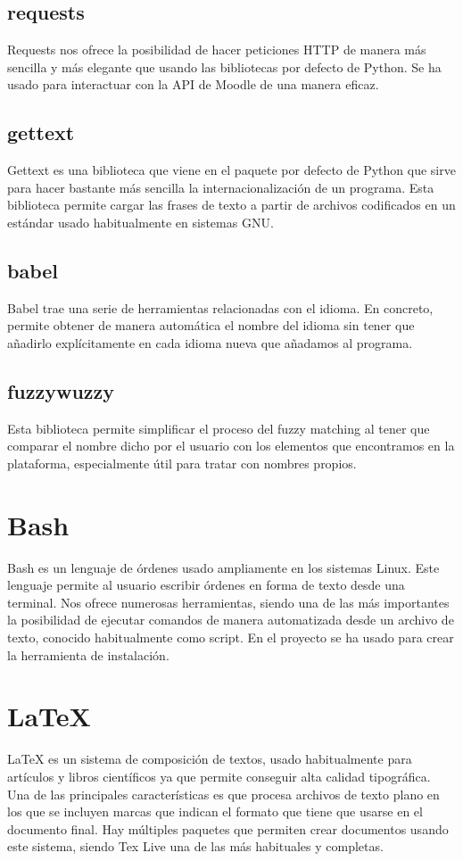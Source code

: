 \subsection{requests}
Requests nos ofrece la posibilidad de hacer peticiones HTTP de manera más sencilla y más elegante que usando las bibliotecas por defecto de Python. Se ha usado para interactuar con la API de Moodle de una manera eficaz.
\subsection{gettext}
Gettext es una biblioteca que viene en el paquete por defecto de Python que sirve para hacer bastante más sencilla la internacionalización de un programa. Esta biblioteca permite cargar las frases de texto a partir de archivos codificados en un estándar usado habitualmente en sistemas GNU.
\subsection{babel}
Babel trae una serie de herramientas relacionadas con el idioma. En concreto, permite obtener de manera automática el nombre del idioma sin tener que añadirlo explícitamente en cada idioma nueva que añadamos al programa.
\subsection{fuzzywuzzy}
Esta biblioteca permite simplificar el proceso del fuzzy matching al tener que comparar el nombre dicho por el usuario con los elementos que encontramos en la plataforma, especialmente útil para tratar con nombres propios.

\section{Bash}
Bash es un lenguaje de órdenes usado ampliamente en los sistemas Linux. Este lenguaje permite al usuario escribir órdenes en forma de texto desde una terminal. Nos ofrece numerosas herramientas, siendo una de las más importantes la posibilidad de ejecutar comandos de manera automatizada desde un archivo de texto, conocido habitualmente como script. En el proyecto se ha usado para crear la herramienta de instalación.

\section{LaTeX}
LaTeX es un sistema de composición de textos, usado habitualmente para artículos y libros científicos ya que permite conseguir alta calidad tipográfica. Una de las principales características es que procesa archivos de texto plano en los que se incluyen marcas que indican el formato que tiene que usarse en el documento final.
Hay múltiples paquetes que permiten crear documentos usando este sistema, siendo Tex Live una de las más habituales y completas.

